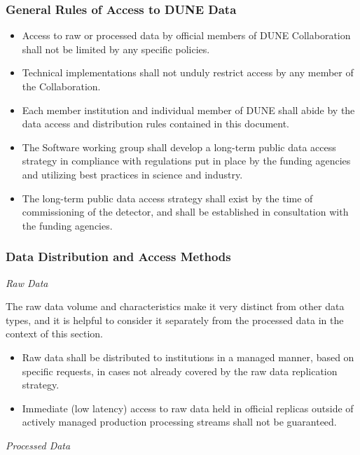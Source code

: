 \subsubsection{General Rules of Access to DUNE Data}
\label{sec:rules-of-access-to-data}

\begin{itemize}
\item Access to raw or processed data by official members of DUNE Collaboration  shall not be limited by any specific policies.

\item Technical implementations shall not unduly restrict access by any member of the Collaboration.

\item Each member institution and individual member of  DUNE shall abide by the data access and distribution rules contained in this document.

\item The Software working group shall develop a long-term public data access strategy in compliance with regulations put in place by the funding agencies and utilizing best practices in science and industry.

\item The long-term public data access strategy shall exist by the time of commissioning of the detector, and shall be established in consultation with the funding agencies.
\end{itemize}

\subsubsection{Data Distribution and Access Methods}
\label{sec:req-data-distribution-and-access}
\textit{Raw Data}

\noindent
The raw data volume and characteristics make it very distinct from other data types, and it is helpful to consider it separately from the processed data in the context of this section. 
\begin{itemize}
\item Raw data shall be distributed to institutions in a managed manner, based on specific requests, in cases not already covered by the raw data replication strategy.

\item Immediate (low latency) access to raw data held in official replicas outside of actively managed production processing streams shall not be guaranteed.
\end{itemize}
\noindent
\textit{Processed Data}

